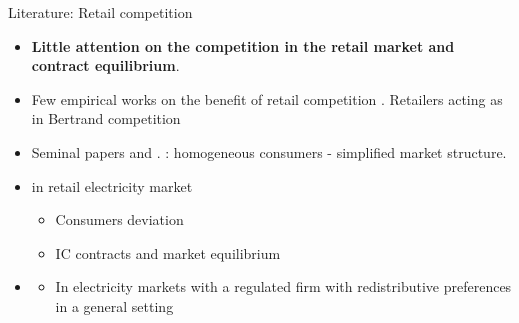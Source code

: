 \documentclass{class}
\begin{document}

\begin{frame}{Literature: Retail competition}\label{Lit_Mkt1}
    
    
\begin{itemize}
    \item \textbf{Little attention on the competition in the retail market and contract equilibrium}.  
    
    \vfill

    \item Few empirical works on the benefit of retail competition \cite{Concettini2013}. Retailers acting as in Bertrand competition \cite{von2010electricity}
    
    \vfill

   \item Seminal papers \cite{joskow2006retail} and \cite{Borenstein2003}. : homogeneous consumers - simplified market structure.

\vfill

   \item  {} in retail electricity market
   
   \begin{itemize}
       \item Consumers deviation \cite{chao2013incentive}
       \item IC contracts and market equilibrium \cite{Astier2021}
   \end{itemize}

\vfill

    \item {}
    \begin{itemize}
        \item In electricity markets with a regulated firm with redistributive preferences \cite{Martimort2020a} in a general setting \cite{Kang2023a}
    \end{itemize}




\end{itemize}

\vfill



\hyperlink{SecondCont}{}

\end{frame}
\end{document}
